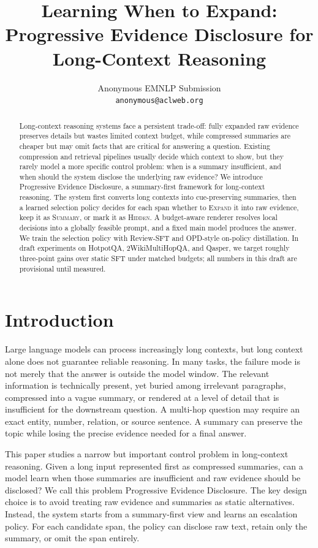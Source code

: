 \documentclass[11pt]{article}
\title{Learning When to Expand: Progressive Evidence Disclosure for Long-Context Reasoning}
\author{
  Anonymous EMNLP Submission \\
  \texttt{anonymous@aclweb.org}
}
\newcommand{\method}{Progressive Evidence Disclosure}
\newcommand{\expandact}{\textsc{Expand}}
\newcommand{\summaryact}{\textsc{Summary}}
\newcommand{\hiddenact}{\textsc{Hidden}}
\begin{document}
\maketitle

\begin{abstract}
Long-context reasoning systems face a persistent trade-off: fully expanded raw evidence preserves details but wastes limited context budget, while compressed summaries are cheaper but may omit facts that are critical for answering a question. Existing compression and retrieval pipelines usually decide which context to show, but they rarely model a more specific control problem: when is a summary insufficient, and when should the system disclose the underlying raw evidence? We introduce \method{}, a summary-first framework for long-context reasoning. The system first converts long contexts into cue-preserving summaries, then a learned selection policy decides for each span whether to \expandact{} it into raw evidence, keep it as \summaryact{}, or mark it as \hiddenact{}. A budget-aware renderer resolves local decisions into a globally feasible prompt, and a fixed main model produces the answer. We train the selection policy with Review-SFT and OPD-style on-policy distillation. In draft experiments on HotpotQA, 2WikiMultiHopQA, and Qasper, we target roughly three-point gains over static SFT under matched budgets; all numbers in this draft are provisional until measured.
\end{abstract}

\section{Introduction}

Large language models can process increasingly long contexts, but long context alone does not guarantee reliable reasoning. In many tasks, the failure mode is not merely that the answer is outside the model window. The relevant information is technically present, yet buried among irrelevant paragraphs, compressed into a vague summary, or rendered at a level of detail that is insufficient for the downstream question. A multi-hop question may require an exact entity, number, relation, or source sentence. A summary can preserve the topic while losing the precise evidence needed for a final answer.

This paper studies a narrow but important control problem in long-context reasoning. Given a long input represented first as compressed summaries, can a model learn when those summaries are insufficient and raw evidence should be disclosed? We call this problem \method{}. The key design choice is to avoid treating raw evidence and summaries as static alternatives. Instead, the system starts from a summary-first view and learns an escalation policy. For each candidate span, the policy can disclose raw text, retain only the summary, or omit the span entirely.
\end{document}

